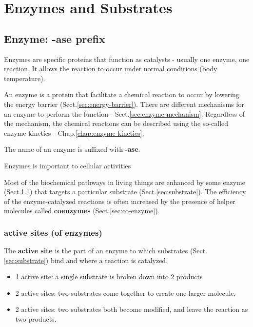 \def\Bmax{{B\text{$_\max$}}}

\chapter{Enzymes and Substrates}
\label{chap:enzymes}

\def\vmax{{\text{v}_\max}}
\def\Km{{\text{K}_m}}
\def\muM{{\mu\text{M}}}

\section{Enzyme: -ase prefix} 
\label{sec:enzyme}
Enzymes are specific proteins that function as catalysts -  usually one
enzyme, one reaction. It allows the reaction to occur under normal conditions
(body temperature).

An enzyme is a protein that facilitate a chemical reaction to occur by
lowering the energy barrier (Sect.\ref{sec:energy-barrier}).
There are different mechanisms for an enzyme to perform the function
- Sect.\ref{sec:enzyme-mechanism}. Regardless of the mechanism, the chemical
reactions can be described using the so-called enzyme kinetics -
Chap.\ref{chap:enzyme-kinetics}.


The name of an enzyme is suffixed with {\bf -ase}.

\begin{framed}
  Enzymes is important to cellular activities
\end{framed}

Most of the biochemical pathways in living things are enhanced by some enzyme
(Sect.\ref{sec:enzyme}) that targets a particular substrate
(Sect.\ref{sec:substrate}). The efficiency of the enzyme-catalyzed reactions is
often increased by the presence of helper molecules called {\bf coenzymes}
(Sect.\ref{sec:co-enzyme}).


\subsection{active sites (of enzymes)}
\label{sec:active-site}

The {\bf active site} is the part of an enzyme to which substrates
(Sect.\ref{sec:substrate}) bind and where a reaction is catalyzed. 
\begin{itemize}
  \item 1 active site: a single substrate is broken down into 2 products
  
  \item 2 active sites: two substrates come together to create one larger
  molecule.
  
  \item 2 active sites: two substrates both become modified, and leave the
  reaction as two products.
\end{itemize}

